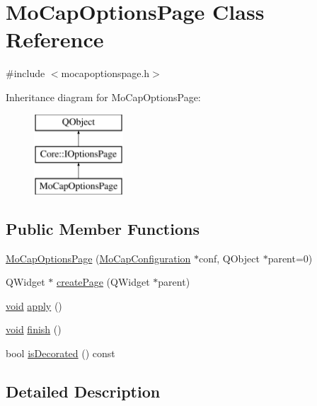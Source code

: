 \hypertarget{class_mo_cap_options_page}{\section{Mo\-Cap\-Options\-Page Class Reference}
\label{class_mo_cap_options_page}
}


{\ttfamily \#include $<$mocapoptionspage.\-h$>$}

Inheritance diagram for Mo\-Cap\-Options\-Page\-:\begin{figure}[H]
\begin{center}
\leavevmode
\includegraphics[height=3.000000cm]{class_mo_cap_options_page}
\end{center}
\end{figure}
\subsection*{Public Member Functions}
\begin{DoxyCompactItemize}
\item 
\hyperlink{group___mo_cap_plugin_gaab2f4270ddf74e0e284cf1ea61d646c8}{Mo\-Cap\-Options\-Page} (\hyperlink{class_mo_cap_configuration}{Mo\-Cap\-Configuration} $\ast$conf, Q\-Object $\ast$parent=0)
\item 
Q\-Widget $\ast$ \hyperlink{group___mo_cap_plugin_gab507e9ec6cd64d26e3034dcf753885ad}{create\-Page} (Q\-Widget $\ast$parent)
\item 
\hyperlink{group___u_a_v_objects_plugin_ga444cf2ff3f0ecbe028adce838d373f5c}{void} \hyperlink{group___mo_cap_plugin_gaa5c95a0fa9de269561e8adb51407862a}{apply} ()
\item 
\hyperlink{group___u_a_v_objects_plugin_ga444cf2ff3f0ecbe028adce838d373f5c}{void} \hyperlink{group___mo_cap_plugin_ga00ac715fe603d78584cf772904147f38}{finish} ()
\item 
bool \hyperlink{group___mo_cap_plugin_gaea29fdd6e8a640f92167d6a581d23eac}{is\-Decorated} () const 
\end{DoxyCompactItemize}


\subsection{Detailed Description}


